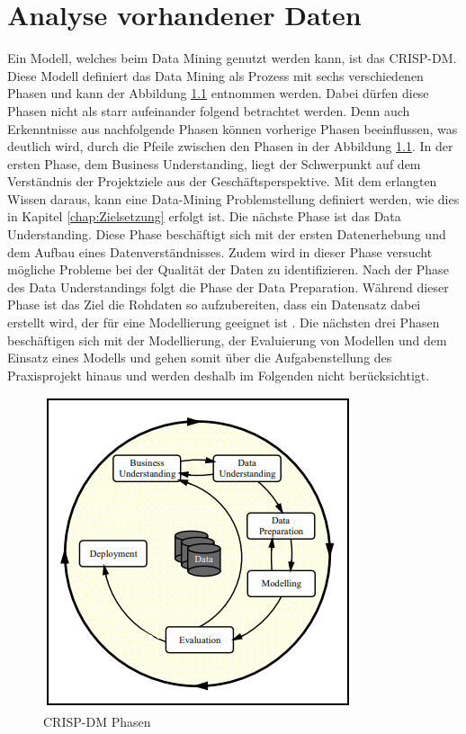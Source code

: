 \chapter{Analyse vorhandener Daten}
\label{chap:kapitel4}

Ein Modell, welches beim Data Mining genutzt werden kann, ist das \ac*{CRISP-DM}. Diese Modell definiert das Data Mining als Prozess mit sechs verschiedenen Phasen und kann der 
Abbildung \ref*{fig:CRISP-DM} entnommen werden. Dabei dürfen diese Phasen nicht als starr aufeinander folgend betrachtet werden. Denn auch Erkenntnisse aus nachfolgende Phasen können vorherige Phasen
beeinflussen, was deutlich wird, durch die Pfeile zwischen den Phasen in der Abbildung \ref*{fig:CRISP-DM}. In der ersten Phase, dem Business Understanding, liegt der Schwerpunkt auf dem Verständnis 
der Projektziele aus der Geschäftsperspektive. Mit dem erlangten Wissen daraus, kann eine Data-Mining Problemstellung definiert werden, wie dies in Kapitel \ref*{chap:Zielsetzung} erfolgt ist. 
Die nächste Phase ist das Data Understanding. Diese Phase beschäftigt sich mit der ersten Datenerhebung und dem Aufbau eines Datenverständnisses. Zudem wird in dieser Phase versucht mögliche Probleme 
bei der Qualität der Daten zu identifizieren. Nach der Phase des Data Understandings folgt die Phase der Data Preparation. Während dieser Phase ist das Ziel die Rohdaten so aufzubereiten, dass ein 
Datensatz dabei erstellt wird, der für eine Modellierung geeignet ist \cite[S.5-7]{q8}. Die nächsten drei Phasen beschäftigen sich mit der Modellierung, der Evaluierung von Modellen und dem Einsatz 
eines Modells und gehen somit über die Aufgabenstellung des Praxisprojekt hinaus und werden deshalb im Folgenden nicht berücksichtigt.

\begin{figure}[H]
    \centering
    \includegraphics[]{abbildungen/CrispDM.PNG}
    \caption{\ac*{CRISP-DM} Phasen \cite[S.5]{q8}}
    \label{fig:CRISP-DM}
\end{figure}

